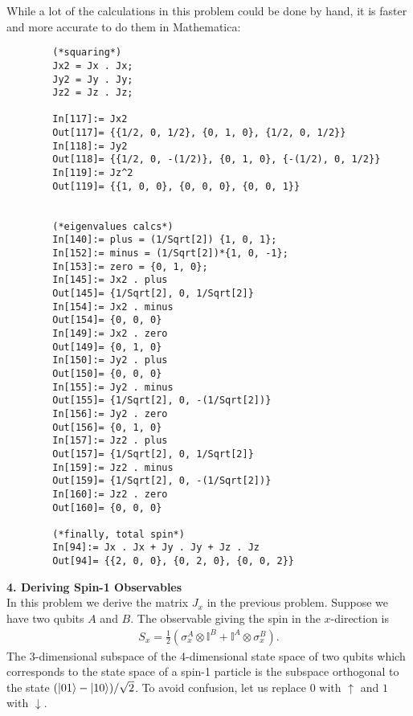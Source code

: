\documentclass{article}
\theoremstyle{definition}
\newcommand{\f}[2]{\frac{#1}{#2}}
\newcommand{\lp}{\left(}
\newcommand{\rp}{\right)}
\begin{document}
\begin{enumerate}[label=(\alph*)]
	
	
	
	While a lot of the calculations in this problem could be done by hand, it is faster and more accurate to do them in Mathematica:
	\begin{lstlisting}
		(*squaring*)
		Jx2 = Jx . Jx;
		Jy2 = Jy . Jy;
		Jz2 = Jz . Jz;
		
		In[117]:= Jx2
		Out[117]= {{1/2, 0, 1/2}, {0, 1, 0}, {1/2, 0, 1/2}}
		In[118]:= Jy2
		Out[118]= {{1/2, 0, -(1/2)}, {0, 1, 0}, {-(1/2), 0, 1/2}}
		In[119]:= Jz^2
		Out[119]= {{1, 0, 0}, {0, 0, 0}, {0, 0, 1}}
		
		
		(*eigenvalues calcs*)
		In[140]:= plus = (1/Sqrt[2]) {1, 0, 1};
		In[152]:= minus = (1/Sqrt[2])*{1, 0, -1};
		In[153]:= zero = {0, 1, 0};	
		In[145]:= Jx2 . plus
		Out[145]= {1/Sqrt[2], 0, 1/Sqrt[2]}
		In[154]:= Jx2 . minus
		Out[154]= {0, 0, 0}
		In[149]:= Jx2 . zero
		Out[149]= {0, 1, 0}
		In[150]:= Jy2 . plus
		Out[150]= {0, 0, 0}
		In[155]:= Jy2 . minus
		Out[155]= {1/Sqrt[2], 0, -(1/Sqrt[2])}
		In[156]:= Jy2 . zero
		Out[156]= {0, 1, 0}
		In[157]:= Jz2 . plus
		Out[157]= {1/Sqrt[2], 0, 1/Sqrt[2]}
		In[159]:= Jz2 . minus
		Out[159]= {1/Sqrt[2], 0, -(1/Sqrt[2])}
		In[160]:= Jz2 . zero
		Out[160]= {0, 0, 0}
		
		(*finally, total spin*)
		In[94]:= Jx . Jx + Jy . Jy + Jz . Jz
		Out[94]= {{2, 0, 0}, {0, 2, 0}, {0, 0, 2}}
	\end{lstlisting}

\end{enumerate}





\noindent \textbf{4. Deriving Spin-1 Observables}\\

\noindent In this problem we derive the matrix $J_x$ in the previous problem. Suppose we have two qubits $A$ and $B$. The observable giving the spin in the $x$-direction is 
\begin{align*}
	S_x = \f{1}{2}\lp \sigma_x^A\otimes \mathbb{I}^B + \mathbb{I}^A \otimes \sigma_x^B \rp.
\end{align*}
The 3-dimensional subspace of the 4-dimensional state space of two qubits which corresponds to the state space of a spin-1 particle is the subspace orthogonal to the state $(\ket{01}- \ket{10})/\sqrt{2}$. To avoid confusion, let us replace $0$ with $\uparrow$ and $1$ with $\downarrow$.\\
\end{document}
